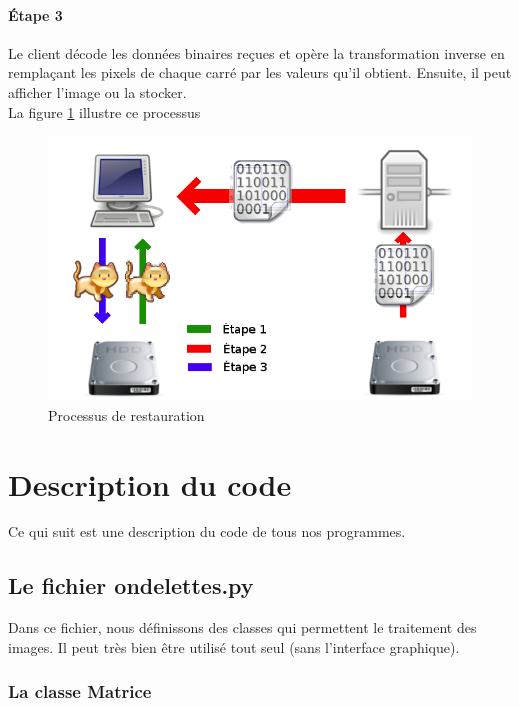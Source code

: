 \documentclass{article}
\begin{document}
\paragraph{Étape 3}

Le client décode les données binaires reçues et opère la transformation inverse en remplaçant les pixels de chaque carré par les valeurs qu'il obtient. Ensuite, il peut afficher l'image ou la stocker.\\

La figure \ref{load} illustre ce processus

 
\begin{figure}[!h]
\centering
\includegraphics[scale=0.5]{load.png}
\caption{Processus de restauration}
\label{load}
\end{figure}


\clearpage

\section{Description du code}

Ce qui suit est une description du code de tous nos programmes.

\subsection{Le fichier ondelettes.py }

Dans ce fichier, nous définissons des classes qui permettent le traitement des images. Il peut très bien être utilisé tout seul (sans l'interface graphique). 

\subsubsection{La classe Matrice }
\end{document}
